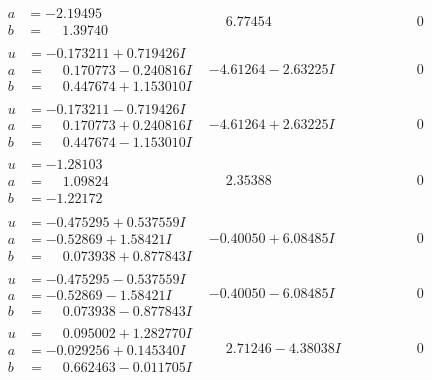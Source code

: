 \documentclass[1p]{elsarticle_modified}
\theoremstyle{definition}
\begin{document}
$$\begin{array}{c|c|c}
\begin{aligned}
a &= -2.19495\phantom{ +0.000000I} \\
b &= \phantom{-}1.39740\phantom{ +0.000000I}\end{aligned}
 & \phantom{-}6.77454\phantom{ +0.000000I} & \phantom{-0.000000 } 0 \\ \hline\begin{aligned}
u &= -0.173211 + 0.719426 I \\
a &= \phantom{-}0.170773 - 0.240816 I \\
b &= \phantom{-}0.447674 + 1.153010 I\end{aligned}
 & -4.61264 - 2.63225 I & \phantom{-0.000000 } 0 \\ \hline\begin{aligned}
u &= -0.173211 - 0.719426 I \\
a &= \phantom{-}0.170773 + 0.240816 I \\
b &= \phantom{-}0.447674 - 1.153010 I\end{aligned}
 & -4.61264 + 2.63225 I & \phantom{-0.000000 } 0 \\ \hline\begin{aligned}
u &= -1.28103\phantom{ +0.000000I} \\
a &= \phantom{-}1.09824\phantom{ +0.000000I} \\
b &= -1.22172\phantom{ +0.000000I}\end{aligned}
 & \phantom{-}2.35388\phantom{ +0.000000I} & \phantom{-0.000000 } 0 \\ \hline\begin{aligned}
u &= -0.475295 + 0.537559 I \\
a &= -0.52869 + 1.58421 I \\
b &= \phantom{-}0.073938 + 0.877843 I\end{aligned}
 & -0.40050 + 6.08485 I & \phantom{-0.000000 } 0 \\ \hline\begin{aligned}
u &= -0.475295 - 0.537559 I \\
a &= -0.52869 - 1.58421 I \\
b &= \phantom{-}0.073938 - 0.877843 I\end{aligned}
 & -0.40050 - 6.08485 I & \phantom{-0.000000 } 0 \\ \hline\begin{aligned}
u &= \phantom{-}0.095002 + 1.282770 I \\
a &= -0.029256 + 0.145340 I \\
b &= \phantom{-}0.662463 - 0.011705 I\end{aligned}
 & \phantom{-}2.71246 - 4.38038 I & \phantom{-0.000000 } 0 \\ \hline\begin{aligned}

\end{aligned}
\end{array}$$
\end{document}
